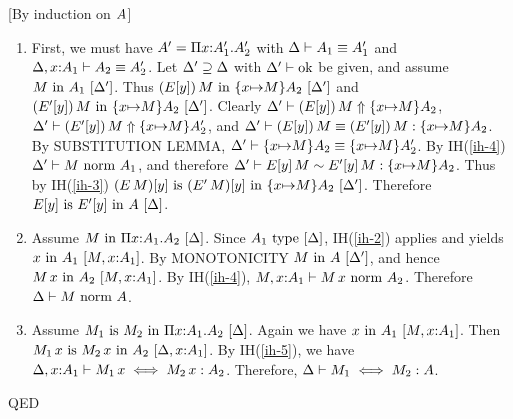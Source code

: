 \documentclass{article}
\theoremstyle{break}
\newcommand{\qed}{\mbox{QED}}
\newenvironment{proof}{\noindent{\bf Proof:}\hspace*{0.5em}}{\hspace*{\fill}\qed}
\begin{document}
\begin{proof}[By induction on $\kind$]
\begin{itemize}
\begin{enumerate}
\item
First, we must have $\kind'=\kpi{\cvar}{\kind'_1}{\kind'_2}$ with
$\equivkind{\world}{\kind_1}{\kind'_1}$ and $\equivkind{\world,\cvar{:}\kind_1}{\kind_2}{\kind'_2}$.
Let $\world'\supseteq\world$ with $\validcontext{\world'}$ be given, and assume
$\semanticvalidterm{\world'}{\constructor}{\kind_1}$.  Thus 
$\semanticvalidterm{\world'}{\capply{(E[\othercvar])}{\constructor}}
  {\substitute{\cvar}{\constructor}{\kind_2}}$ %
and
$\semanticvalidterm{\world'}{\capply{(E'[\othercvar])}{\constructor}}
  {\substitute{\cvar}{\constructor}{\kind_2}}$. %
Clearly $\reconstruct{\world'}{\capply{(E[\othercvar])}{\constructor}}
  {\substitute{\cvar}{\constructor}{\kind_2}}$, %
$\reconstruct{\world'}{\capply{(E'[\othercvar])}{\constructor}}
  {\substitute{\cvar}{\constructor}{\kind'_2}}$, %
and $\equivconstructor{\world'}{\capply{(E[\othercvar])}{\constructor}}{\capply{(E'[\othercvar])}{\constructor}}
  {\substitute{\cvar}{\constructor}{\kind_2}}$. %
By SUBSTITUTION LEMMA, 
$\equivkind{\world'}{\substitute{\cvar}{\constructor}{\kind_2}}{\substitute{\cvar}{\constructor}{\kind'_2}}$.
By IH(\ref{ih-4}) $\normterm{\world'}{\constructor}{\kind_1}$, and therefore
$\weakconequiv{\world'}{\capply{E[\othercvar]}{\constructor}}{\capply{E'[\othercvar]}{\constructor}}
{\substitute{\cvar}{\constructor}{\kind_2}}$. %
Thus by IH(\ref{ih-3})
$\semanticequivterm{\world'}{(\capply{E}{\constructor})[\othercvar]}{(\capply{E'}{\constructor})[\othercvar]}
{\substitute{\cvar}{\constructor}{\kind_2}}$. %
Therefore $\semanticequivterm{\world}{E[\othercvar]}{E'[\othercvar]}{\kind}$.
\item Assume
$\semanticvalidterm{\world}{\constructor}{\kpi{\cvar}{\kind_1}{\kind_2}}$.
Since $\semanticvalidtype{\world}{\kind_1}$,
IH(\ref{ih-2}) applies and yields
$\semanticvalidterm{\constructor,\cvar{:}\kind_1}{\cvar}{\kind_1}$.
By MONOTONICITY
$\semanticvalidterm{\world'}{\constructor}{\kind}$, and hence
$\semanticvalidterm{\constructor,\cvar{:}\kind_1}{\capply{\constructor}{\cvar}}{\kind_2}$.
By IH(\ref{ih-4}), $\normterm{\constructor,\cvar{:}\kind_1}{\capply{\constructor}{\cvar}}{\kind_2}$.
Therefore $\normterm{\world}{\constructor}{\kind}$.
\item Assume $\semanticequivterm{\world}{\constructor_1}{\constructor_2}{\kpi{\cvar}{\kind_1}{\kind_2}}$.
Again we have 
$\semanticvalidterm{\constructor,\cvar{:}\kind_1}{\cvar}{\kind_1}$.
Then $\semanticequivterm{\world,\cvar{:}\kind_1}{\capply{\constructor_1}{\cvar}}
{\capply{\constructor_2}{\cvar}}{\kind_2}$.  %
By IH(\ref{ih-5}), 
we have $\aconequiv{\world,\cvar{:}\kind_1}{\capply{\constructor_1}{\cvar}}
{\capply{\constructor_2}{\cvar}}{\kind_2}$.  %
Therefore, $\aconequiv{\world}{\constructor_1}{\constructor_2}{\kind}$.
\end{enumerate}




\end{itemize}
\end{proof}
\end{document}
